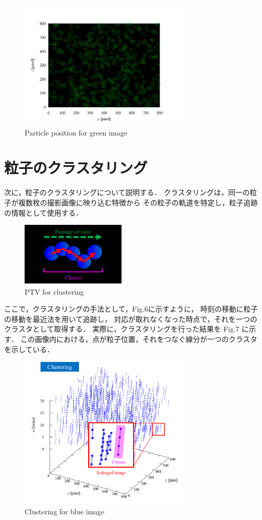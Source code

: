 \documentclass[twocolumn,a4j]{jsarticle}
\begin{document}
\begin{figure}[htbp]
	\centering
	\includegraphics[keepaspectratio, width=82mm]{../images/particle_position.png}
	\caption{Particle position for green image}
\end{figure}

\newpage
\section{粒子のクラスタリング}
次に，粒子のクラスタリングについて説明する．
クラスタリングは，同一の粒子が複数枚の撮影画像に映り込む特徴から
その粒子の軌道を特定し，粒子追跡の情報として使用する．

\begin{figure}[htbp]
	\centering
	\includegraphics[keepaspectratio, width=50mm]{../images/how_to_get_cluster.png}
	\caption{PTV for clustering}
\end{figure}

ここで，クラスタリングの手法として，Fig.6に示すように，
時刻の移動に粒子の移動を最近法を用いて追跡し，
対応が取れなくなった時点で，それを一つのクラスタとして取得する．
実際に，クラスタリングを行った結果を Fig.7 に示す．
この画像内における，点が粒子位置，それをつなぐ線分が一つのクラスタを示している．

\begin{figure}[htbp]
	\centering
	\includegraphics[keepaspectratio, width=82mm]{../images/clustering_for_blue_image.png}
	\caption{Clustering for blue image}
\end{figure}
\end{document}
